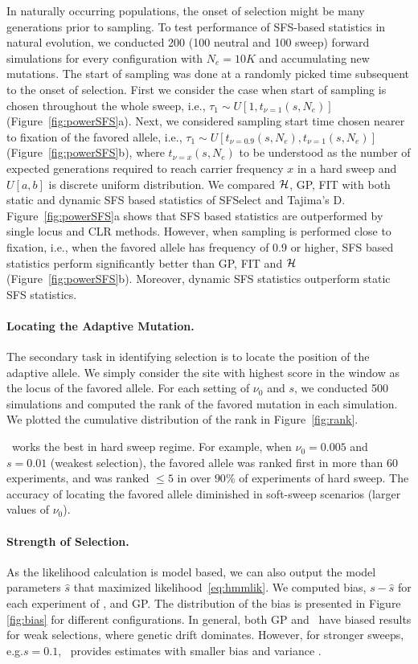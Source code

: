 \documentclass[11pt]{article}
\def\comale{\text{{\sc Comale}}}
\begin{document}
In naturally occurring populations, the onset of selection might be
many generations prior to sampling. To test performance of SFS-based
statistics in natural evolution, we conducted 200 (100 neutral and 100
sweep) forward simulations for every configuration with $N_e=10K$ and
accumulating new mutations. The start of sampling was done at a
randomly picked time subsequent to the onset of selection. First we
consider the case when start of sampling is chosen throughout the
whole sweep, i.e., $\tau_1 \sim U\left[1,t_{\nu=1}(s,N_e)\right]$
(Figure~\ref{fig:powerSFS}a). Next, we considered sampling start time
chosen nearer to fixation of the favored allele, i.e., $\tau_1 \sim
U\left[t_{\nu=0.9}(s,N_e),t_{\nu=1}(s,N_e)\right]$
(Figure~\ref{fig:powerSFS}b), where $t_{\nu=x}(s,N_e)$ to be
understood as the number of expected generations required to reach
carrier frequency $x$ in a hard sweep and $U[a,b]$ is discrete uniform
distribution.  We compared ${\cal H}$, GP, FIT with both static and dynamic
SFS based statistics of SFSelect and Tajima's
D. Figure~\ref{fig:powerSFS}a shows that SFS based statistics are
outperformed by single locus and CLR methods. However, when sampling
is performed close to fixation, i.e., when the favored allele has
frequency of 0.9 or higher, SFS based statistics perform significantly
better than GP, FIT and ${\cal H}$ (Figure~\ref{fig:powerSFS}b). Moreover,
dynamic SFS statistics outperform static SFS statistics.


\paragraph{Locating the Adaptive Mutation.}
The secondary task in identifying selection is to locate the position
of the adaptive allele. We simply consider the site with highest score
in the window as the locus of the favored allele. For each setting
of $\nu_0$ and $s$, we conducted 500 simulations
and computed the rank of the favored mutation in each
simulation. We plotted the cumulative distribution of the rank in
Figure~\ref{fig:rank}.

\comale\ works the best in hard sweep regime. For example, when
$\nu_0=0.005$ and $s=0.01$ (weakest selection), the favored allele was
ranked first in more than 60 experiments, and was ranked $\le 5$ in
over $90$\% of experiments of hard sweep. The accuracy of locating the
favored allele diminished in soft-sweep scenarios (larger values of
$\nu_0$). 
\paragraph{Strength of Selection.}
As the likelihood calculation is model based, we can also output the
model parameters $\hat{s}$ that maximized
likelihood~\eqref{eq:hmmlik}. We computed bias, $s-\hat{s}$ for each
experiment of \comale, and GP. The distribution of the bias is
presented in Figure \ref{fig:bias} for different configurations. In
general, both GP and \comale\ have biased results for weak selections,
where genetic drift dominates. However, for stronger sweeps,
e.g.$s=0.1$, \comale\ provides estimates with smaller bias and
variance .
\end{document}
